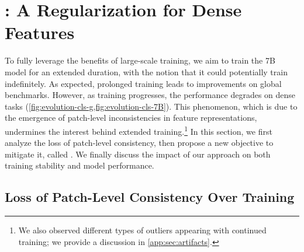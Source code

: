 \section[Gram: A Regularization for Dense Features]{\Gramname: A Regularization for Dense Features}
\label{sec:gram}

To fully leverage the benefits of large-scale training, we aim to train the 7B model for an extended duration, with the notion that it could potentially train indefinitely. As expected, prolonged training leads to improvements on global benchmarks. However, as training progresses, the performance degrades on dense tasks (\cref{fig:evolution-cls-g,fig:evolution-cls-7B}). 
This phenomenon, which is due to the emergence of patch-level inconsistencies in feature representations, undermines the interest behind extended training.\footnote{%
We also observed different types of outliers appearing with continued training; we provide a discussion in \cref{app:sec:artifacts}.
} 
In this section, we first analyze the loss of patch-level consistency, then propose a new objective to mitigate it, called \emph{\gramname}. 
We finally discuss the impact of our approach on both training stability and model performance.


\subsection{Loss of Patch-Level Consistency Over Training}





